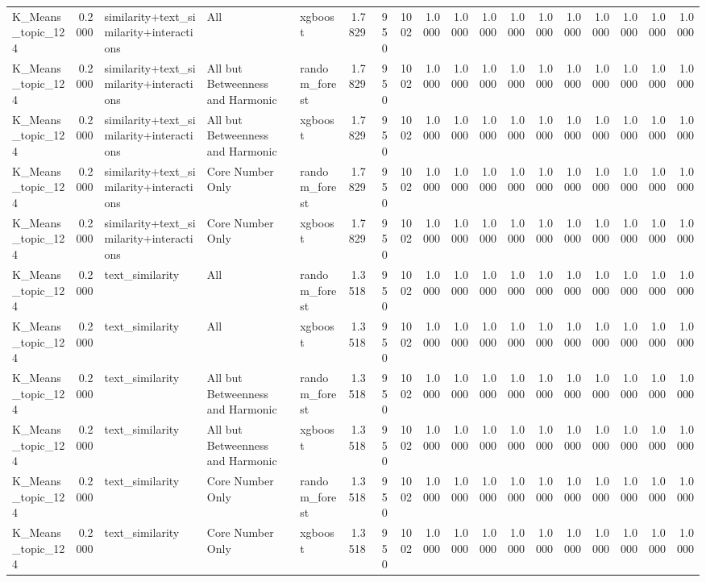 \begin{tabular}{lrlllrrrrrrrrrrrrr}
K_Means_topic_124 & 0.2000 & similarity+text_similarity+interactions & All & xgboost & 1.7829 & 950 & 1002 & 1.0000 & 1.0000 & 1.0000 & 1.0000 & 1.0000 & 1.0000 & 1.0000 & 1.0000 & 1.0000 & 1.0000 \\
K_Means_topic_124 & 0.2000 & similarity+text_similarity+interactions & All but Betweenness and Harmonic & random_forest & 1.7829 & 950 & 1002 & 1.0000 & 1.0000 & 1.0000 & 1.0000 & 1.0000 & 1.0000 & 1.0000 & 1.0000 & 1.0000 & 1.0000 \\
K_Means_topic_124 & 0.2000 & similarity+text_similarity+interactions & All but Betweenness and Harmonic & xgboost & 1.7829 & 950 & 1002 & 1.0000 & 1.0000 & 1.0000 & 1.0000 & 1.0000 & 1.0000 & 1.0000 & 1.0000 & 1.0000 & 1.0000 \\
K_Means_topic_124 & 0.2000 & similarity+text_similarity+interactions & Core Number Only & random_forest & 1.7829 & 950 & 1002 & 1.0000 & 1.0000 & 1.0000 & 1.0000 & 1.0000 & 1.0000 & 1.0000 & 1.0000 & 1.0000 & 1.0000 \\
K_Means_topic_124 & 0.2000 & similarity+text_similarity+interactions & Core Number Only & xgboost & 1.7829 & 950 & 1002 & 1.0000 & 1.0000 & 1.0000 & 1.0000 & 1.0000 & 1.0000 & 1.0000 & 1.0000 & 1.0000 & 1.0000 \\
K_Means_topic_124 & 0.2000 & text_similarity & All & random_forest & 1.3518 & 950 & 1002 & 1.0000 & 1.0000 & 1.0000 & 1.0000 & 1.0000 & 1.0000 & 1.0000 & 1.0000 & 1.0000 & 1.0000 \\
K_Means_topic_124 & 0.2000 & text_similarity & All & xgboost & 1.3518 & 950 & 1002 & 1.0000 & 1.0000 & 1.0000 & 1.0000 & 1.0000 & 1.0000 & 1.0000 & 1.0000 & 1.0000 & 1.0000 \\
K_Means_topic_124 & 0.2000 & text_similarity & All but Betweenness and Harmonic & random_forest & 1.3518 & 950 & 1002 & 1.0000 & 1.0000 & 1.0000 & 1.0000 & 1.0000 & 1.0000 & 1.0000 & 1.0000 & 1.0000 & 1.0000 \\
K_Means_topic_124 & 0.2000 & text_similarity & All but Betweenness and Harmonic & xgboost & 1.3518 & 950 & 1002 & 1.0000 & 1.0000 & 1.0000 & 1.0000 & 1.0000 & 1.0000 & 1.0000 & 1.0000 & 1.0000 & 1.0000 \\
K_Means_topic_124 & 0.2000 & text_similarity & Core Number Only & random_forest & 1.3518 & 950 & 1002 & 1.0000 & 1.0000 & 1.0000 & 1.0000 & 1.0000 & 1.0000 & 1.0000 & 1.0000 & 1.0000 & 1.0000 \\
K_Means_topic_124 & 0.2000 & text_similarity & Core Number Only & xgboost & 1.3518 & 950 & 1002 & 1.0000 & 1.0000 & 1.0000 & 1.0000 & 1.0000 & 1.0000 & 1.0000 & 1.0000 & 1.0000 & 1.0000 \\

\end{tabular}
